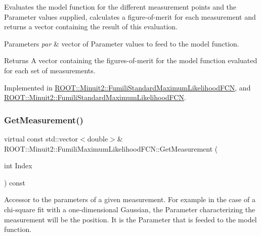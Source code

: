Evaluates the model function for the different measurement points and the Parameter values supplied, calculates a figure-\/of-\/merit for each measurement and returns a vector containing the result of this evaluation.


\begin{DoxyParams}{Parameters}
{\em par} & vector of Parameter values to feed to the model function.\\
\hline
\end{DoxyParams}
\begin{DoxyReturn}{Returns}
A vector containing the figures-\/of-\/merit for the model function evaluated for each set of measurements. 
\end{DoxyReturn}


Implemented in \mbox{\hyperlink{classROOT_1_1Minuit2_1_1FumiliStandardMaximumLikelihoodFCN_a19866fac44787dee8e2a6a35e7a15fe1}{R\+O\+O\+T\+::\+Minuit2\+::\+Fumili\+Standard\+Maximum\+Likelihood\+F\+CN}}, and \mbox{\hyperlink{classROOT_1_1Minuit2_1_1FumiliStandardMaximumLikelihoodFCN_af104474f9095c245b467f9db554a126a}{R\+O\+O\+T\+::\+Minuit2\+::\+Fumili\+Standard\+Maximum\+Likelihood\+F\+CN}}.

\mbox{\label{classROOT_1_1Minuit2_1_1FumiliMaximumLikelihoodFCN_ac3e28c8d3e14a1df3145891ae99ac35d}} 
\subsubsection{\texorpdfstring{GetMeasurement()}{GetMeasurement()}\hspace{0.1cm}{\footnotesize\ttfamily [1/2]}}
{\footnotesize\ttfamily virtual const std\+::vector$<$double$>$\& R\+O\+O\+T\+::\+Minuit2\+::\+Fumili\+Maximum\+Likelihood\+F\+C\+N\+::\+Get\+Measurement (\begin{DoxyParamCaption}\item[{int}]{Index }\end{DoxyParamCaption}) const\hspace{0.3cm}{\ttfamily [pure virtual]}}

Accessor to the parameters of a given measurement. For example in the case of a chi-\/square fit with a one-\/dimensional Gaussian, the Parameter characterizing the measurement will be the position. It is the Parameter that is feeded to the model function.


